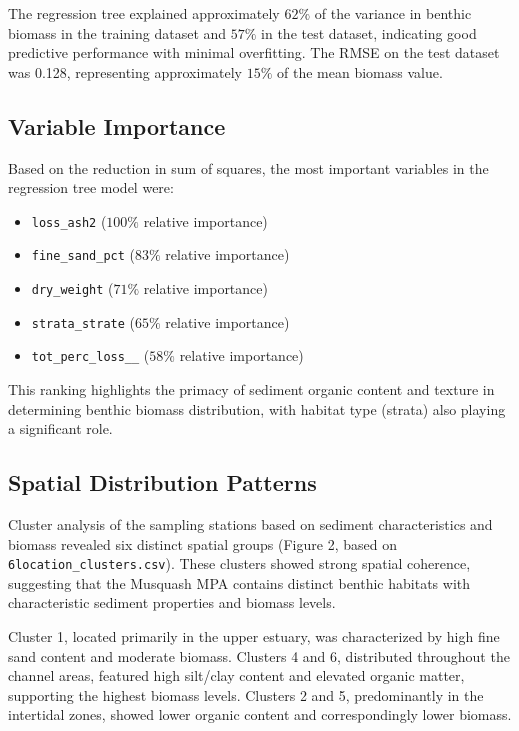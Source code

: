 \documentclass[12pt]{article}
\begin{document}
\qquad The regression tree explained approximately $62\%$ of the variance in
benthic biomass in the training dataset and $57\%$ in the test dataset,
indicating good predictive performance with minimal overfitting. The RMSE on the
test dataset was 0.128, representing approximately $15\%$ of the mean biomass
value.

\subsection{Variable Importance}

\qquad Based on the reduction in sum of squares, the most important variables in
the regression tree model were:

\begin{itemize}
    \item \texttt{loss\_ash2} ($100\%$ relative importance)
    \item \texttt{fine\_sand\_pct} ($83\%$ relative importance)
    \item \texttt{dry\_weight} ($71\%$ relative importance)
    \item \texttt{strata\_strate} ($65\%$ relative importance)
    \item \texttt{tot\_perc\_loss\_\_} ($58\%$ relative importance)
\end{itemize}

\qquad This ranking highlights the primacy of sediment organic content and
texture in determining benthic biomass distribution, with habitat type (strata)
also playing a significant role.

\subsection{Spatial Distribution Patterns}

\qquad Cluster analysis of the sampling stations based on sediment
characteristics and biomass revealed six distinct spatial groups (Figure 2,
based on \texttt{6location\_clusters.csv}). These clusters showed strong spatial
coherence, suggesting that the Musquash MPA contains distinct benthic habitats
with characteristic sediment properties and biomass levels.


\qquad Cluster 1, located primarily in the upper estuary, was characterized by
high fine sand content and moderate biomass. Clusters 4 and 6, distributed
throughout the channel areas, featured high silt/clay content and elevated
organic matter, supporting the highest biomass levels. Clusters 2 and 5,
predominantly in the intertidal zones, showed lower organic content and
correspondingly lower biomass.
\end{document}
